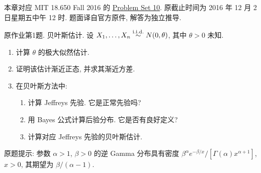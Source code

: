 \label{chap:ps10}
本章对应 MIT 18.650 Fall 2016 的 \href{https://ocw.mit.edu/courses/18-650-statistics-for-applications-fall-2016/resources/problem-set-10/}{Problem Set 10}. 原截止时间为 2016 年 12 月 2 日星期五中午 12 时. 题面译自官方原件, 解答为独立推导.

\begin{exercise}\label{ps10:p01}
原作业第1题. 贝叶斯估计.
设 $X_1,\ldots,X_n\stackrel{\mathrm{i.i.d.}}{\sim} N(0,\theta)$, 其中 $\theta>0$ 未知.
\begin{enumerate}[label=\arabic*.]
\item 计算 $\theta$ 的极大似然估计.
\item 证明该估计渐近正态, 并求其渐近方差.
\item 在贝叶斯方法中:
\begin{enumerate}[label=\alph*)]
\item 计算 Jeffreys 先验. 它是正常先验吗?
\item 用 Bayes 公式计算后验分布. 它是否有良好定义?
\item 计算对应 Jeffreys 先验的贝叶斯估计.
\end{enumerate}
\end{enumerate}
原题提示: 参数 $\alpha>1$, $\beta>0$ 的逆 Gamma 分布具有密度 $\beta^\alpha e^{-\beta/x}/[\Gamma(\alpha)x^{\alpha+1}]$, $x>0$, 其期望为 $\beta/(\alpha-1)$.
\end{exercise}
